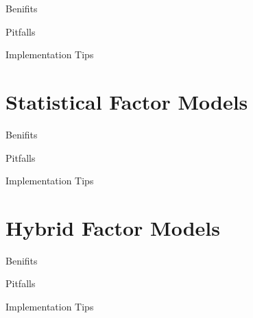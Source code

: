 \begin{frame}{Benifits}

\end{frame}

\begin{frame}{Pitfalls}

\end{frame}

\begin{frame}{Implementation Tips}

\end{frame}

\section{Statistical Factor Models}\label{statistical-factor-models-1}

\begin{frame}{Benifits}

\end{frame}

\begin{frame}{Pitfalls}

\end{frame}

\begin{frame}{Implementation Tips}

\end{frame}

\section{Hybrid Factor Models}\label{hybrid-factor-models-1}

\begin{frame}{Benifits}

\end{frame}

\begin{frame}{Pitfalls}

\end{frame}

\begin{frame}{Implementation Tips}

\end{frame}
